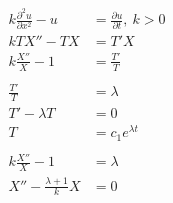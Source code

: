 \documentclass{article}
\begin{document}
\begin{align*}
  k \frac{\partial^2 u}{\partial x^2} - u & = \frac{\partial u}{\partial t},\ k > 0                                                                                                                                                                                               \\
  k T X'' - T X                           & = T' X                                                                                                                                                                                                                                \\
  k \frac{X''}{X} - 1                     & = \frac{T'}{T}                                                                                                                                                                                                                        \\ \\
  \frac{T'}{T}                            & = \lambda                                                                                                                                                                                                                             \\
  T' - \lambda T                          & = 0                                                                                                                                                                                                                                   \\
  T                                       & = c_1 e^{\lambda t}                                                                                                                                                                                                                   \\ \\
  k \frac{X''}{X} - 1                     & = \lambda                                                                                                                                                                                                                             \\
  X'' - \frac{\lambda + 1}{k} X           & = 0                                                                                                                                                                                                                                   \\

\end{align*}
\end{document}
